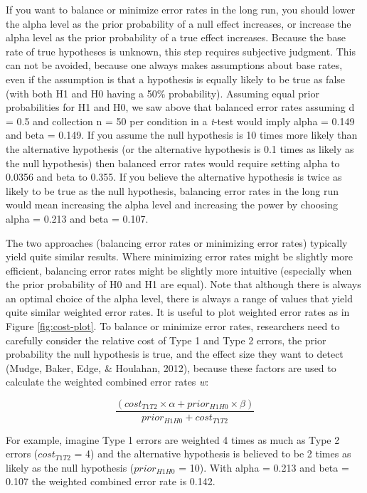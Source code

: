 \documentclass[
  english,
  ,man,floatsintext]{apa6}
\begin{document}
If you want to balance or minimize error rates in the long run, you should lower the alpha level as the prior probability of a null effect increases, or increase the alpha level as the prior probability of a true effect increases. Because the base rate of true hypotheses is unknown, this step requires subjective judgment. This can not be avoided, because one always makes assumptions about base rates, even if the assumption is that a hypothesis is equally likely to be true as false (with both H1 and H0 having a 50\% probability). Assuming equal prior probabilities for H1 and H0, we saw above that balanced error rates assuming d = 0.5 and collection n = 50 per condition in a \emph{t}-test would imply alpha = 0.149 and beta = 0.149. If you assume the null hypothesis is 10 times more likely than the alternative hypothesis (or the alternative hypothesis is 0.1 times as likely as the null hypothesis) then balanced error rates would require setting alpha to 0.0356 and beta to 0.355. If you believe the alternative hypothesis is twice as likely to be true as the null hypothesis, balancing error rates in the long run would mean increasing the alpha level and increasing the power by choosing alpha = 0.213 and beta = 0.107.

The two approaches (balancing error rates or minimizing error rates) typically yield quite similar results. Where minimizing error rates might be slightly more efficient, balancing error rates might be slightly more intuitive (especially when the prior probability of H0 and H1 are equal). Note that although there is always an optimal choice of the alpha level, there is always a range of values that yield quite similar weighted error rates. It is useful to plot weighted error rates as in Figure \ref{fig:cost-plot}. To balance or minimize error rates, researchers need to carefully consider the relative cost of Type 1 and Type 2 errors, the prior probability the null hypothesis is true, and the effect size they want to detect (Mudge, Baker, Edge, \& Houlahan, 2012), because these factors are used to calculate the weighted combined error rates \emph{w}:

\begin{equation}
\frac{(cost_{T1T2} \times \alpha + prior_{H1H0} \times \beta)}{prior_{H1H0}+cost_{T1T2}}
\label{eq:minimize}
\end{equation}

For example, imagine Type 1 errors are weighted 4 times as much as Type 2 errors (\(cost_{T1T2}\) = 4) and the alternative hypothesis is believed to be 2 times as likely as the null hypothesis (\(prior_{H1H0}\) = 10). With alpha = 0.213 and beta = 0.107 the weighted combined error rate is 0.142.
\end{document}
